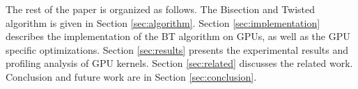 

The rest of the paper is organized as follows.
The Bisection and Twisted algorithm is given in Section \ref{sec:algorithm}.
Section \ref{sec:implementation} describes the implementation of the BT algorithm on GPUs, as well as the GPU specific optimizations.
Section \ref{sec:results} presents the experimental results and profiling analysis of GPU kernels.
Section \ref{sec:related} discusses the related work.
Conclusion and future work are in Section \ref{sec:conclusion}.

